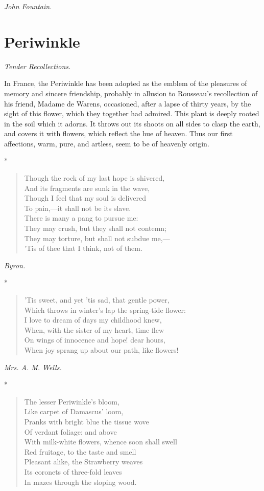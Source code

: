 \documentclass[11pt,twoside]{article}
\newcommand\flower[2]{\section*{#1}\addcontentsline{toc}{section}{#1}%
  \noindent\textit{#2.}\par\medskip}
\newcommand\stars{\begin{center}*\quad*\quad*\end{center}}
\newcommand\by[1]{\par\hfill\textit{#1}\par}
\begin{document}
\by{John Fountain.}

\flower{Periwinkle}{Tender Recollections}

In France, the Periwinkle has been adopted as the emblem of the pleasures of memory and sincere friendship, probably in allusion to Rousseau’s recollection of his friend, Madame de Warens, occasioned, after a lapse of thirty years, by the sight of this flower, which they together had admired. This plant is deeply rooted in the soil which it adorns. It throws out its shoots on all sides to clasp the earth, and covers it with flowers, which reflect the hue of heaven. Thus our first affections, warm, pure, and artless, seem to be of heavenly origin.

\stars

\begin{verse}
Though the rock of my last hope is shivered,\\
\quad And its fragments are sunk in the wave,\\
Though I feel that my soul is delivered\\
\quad To pain,---it shall not be its slave.\\
There is many a pang to pursue me:\\
\quad They may crush, but they shall not contemn;\\
They may torture, but shall not subdue me,---\\
\quad ’Tis of thee that I think, not of them.
\end{verse}

\by{Byron.}

\stars

\begin{verse}
’Tis sweet, and yet ’tis sad, that gentle power,\\
Which throws in winter’s lap the spring-tide flower:\\
I love to dream of days my childhood knew,\\
When, with the sister of my heart, time flew\\
On wings of innocence and hope! dear hours,\\
When joy sprang up about our path, like flowers!
\end{verse}

\by{Mrs. A. M. Wells.}

\stars

\begin{verse}
The lesser Periwinkle’s bloom,\\
Like carpet of Damascus’ loom,\\
Pranks with bright blue the tissue wove\\
Of verdant foliage: and above\\
With milk-white flowers, whence soon shall swell\\
Red fruitage, to the taste and smell\\
Pleasant alike, the Strawberry weaves\\
Its coronets of three-fold leaves\\
In mazes through the sloping wood.
\end{verse}
\end{document}
